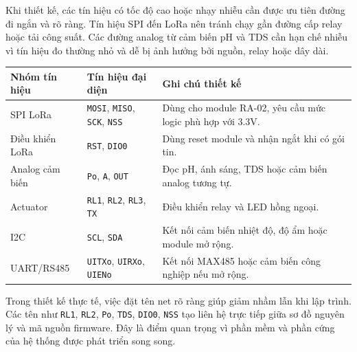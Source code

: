 Khi thiết kế, các tín hiệu có tốc độ cao hoặc nhạy nhiễu cần được ưu tiên đường đi ngắn và rõ ràng. Tín hiệu SPI đến LoRa nên tránh chạy gần đường cấp relay hoặc tải công suất. Các đường analog từ cảm biến pH và TDS cần hạn chế nhiễu vì tín hiệu đo thường nhỏ và dễ bị ảnh hưởng bởi nguồn, relay hoặc dây dài.

\begin{longtable}{|p{3.2cm}|p{4cm}|p{5.8cm}|}
\hline
\textbf{Nhóm tín hiệu} & \textbf{Tín hiệu đại diện} & \textbf{Ghi chú thiết kế} \\
\hline
SPI LoRa & \texttt{MOSI}, \texttt{MISO}, \texttt{SCK}, \texttt{NSS} & Dùng cho module RA-02, yêu cầu mức logic phù hợp với 3.3V. \\
\hline
Điều khiển LoRa & \texttt{RST}, \texttt{DIO0} & Dùng reset module và nhận ngắt khi có gói tin. \\
\hline
Analog cảm biến & \texttt{Po}, \texttt{A}, \texttt{OUT} & Đọc pH, ánh sáng, TDS hoặc cảm biến analog tương tự. \\
\hline
Actuator & \texttt{RL1}, \texttt{RL2}, \texttt{RL3}, \texttt{TX} & Điều khiển relay và LED hồng ngoại. \\
\hline
I2C & \texttt{SCL}, \texttt{SDA} & Kết nối cảm biến nhiệt độ, độ ẩm hoặc module mở rộng. \\
\hline
UART/RS485 & \texttt{UITXo}, \texttt{UIRXo}, \texttt{UIENo} & Kết nối MAX485 hoặc cảm biến công nghiệp nếu mở rộng. \\
\hline
\end{longtable}

Trong thiết kế thực tế, việc đặt tên net rõ ràng giúp giảm nhầm lẫn khi lập trình. Các tên như \texttt{RL1}, \texttt{RL2}, \texttt{Po}, \texttt{TDS}, \texttt{DIO0}, \texttt{NSS} tạo liên hệ trực tiếp giữa sơ đồ nguyên lý và mã nguồn firmware. Đây là điểm quan trọng vì phần mềm và phần cứng của hệ thống được phát triển song song.
